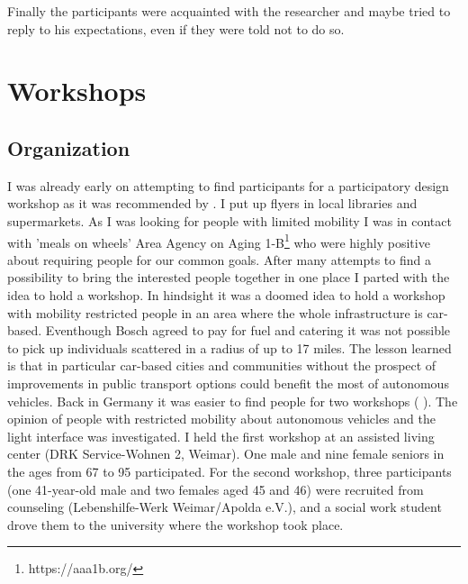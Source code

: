 Finally the participants were acquainted with the researcher and maybe tried to reply to his expectations, even if they were told not to do so. 

\section{Workshops}


\subsection{Organization}
I was already early on attempting to find participants for a participatory design workshop as it was recommended by \cite{Pettersson}. I put up flyers in local libraries and supermarkets. As I was looking for people with limited mobility I was in contact with 'meals on wheels' Area Agency on Aging 1-B\footnote{https://aaa1b.org/} who were highly positive about requiring people for our common goals. After many attempts to find a possibility to bring the interested people together in one place I parted with the idea to hold a workshop. In hindsight it was a doomed idea to hold a workshop with mobility restricted people in an area where the whole infrastructure is car-based. Eventhough Bosch agreed to pay for fuel and catering it was not possible to pick up individuals scattered in a radius of up to 17 miles. The lesson learned is that in particular car-based cities and communities without the prospect of improvements in public transport options could benefit the most of autonomous vehicles. 
Back in Germany it was easier to find people for two workshops ( ). The opinion of people with restricted mobility about autonomous vehicles and the light interface was investigated. I held the first workshop at an assisted living center (DRK Service-Wohnen 2, Weimar). One male and nine female seniors in the ages from 67 to 95 participated. For the second workshop, three participants (one 41-year-old male and two females aged 45 and 46) were recruited from counseling (Lebenshilfe-Werk Weimar/Apolda e.V.), and a social work student drove them to the university where the workshop took place. 
